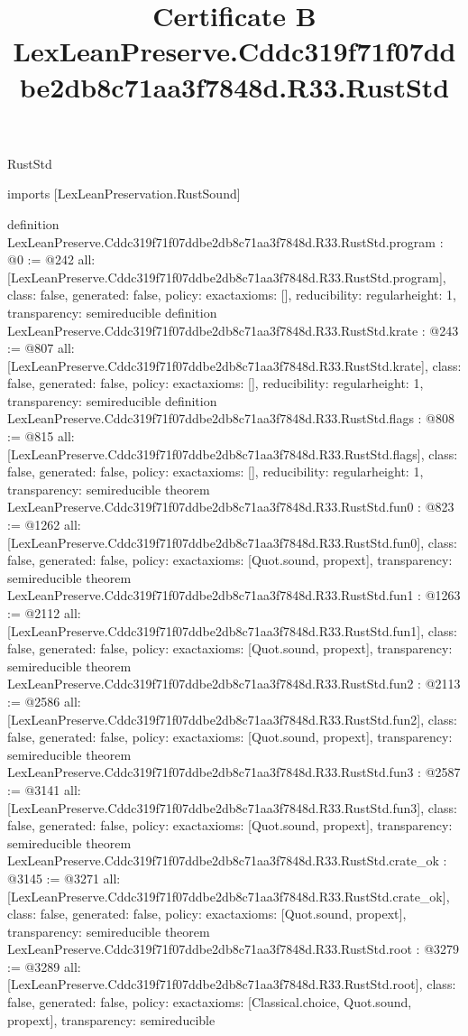 \begin{lexlean}{RustStd}
\title{Certificate B LexLeanPreserve.Cddc319f71f07ddbe2db8c71aa3f7848d.R33.RustStd}
\begin{coremodule}
imports [LexLeanPreservation.RustSound]

definition LexLeanPreserve.Cddc319f71f07ddbe2db8c71aa3f7848d.R33.RustStd.program : @0 := @242 {
  all: [LexLeanPreserve.Cddc319f71f07ddbe2db8c71aa3f7848d.R33.RustStd.program],
  class: false,
  generated: false,
  policy: exact{axioms: []},
  reducibility: regular{height: 1},
  transparency: semireducible
}
definition LexLeanPreserve.Cddc319f71f07ddbe2db8c71aa3f7848d.R33.RustStd.krate : @243 := @807 {
  all: [LexLeanPreserve.Cddc319f71f07ddbe2db8c71aa3f7848d.R33.RustStd.krate],
  class: false,
  generated: false,
  policy: exact{axioms: []},
  reducibility: regular{height: 1},
  transparency: semireducible
}
definition LexLeanPreserve.Cddc319f71f07ddbe2db8c71aa3f7848d.R33.RustStd.flags : @808 := @815 {
  all: [LexLeanPreserve.Cddc319f71f07ddbe2db8c71aa3f7848d.R33.RustStd.flags],
  class: false,
  generated: false,
  policy: exact{axioms: []},
  reducibility: regular{height: 1},
  transparency: semireducible
}
theorem LexLeanPreserve.Cddc319f71f07ddbe2db8c71aa3f7848d.R33.RustStd.fun0 : @823 := @1262 {
  all: [LexLeanPreserve.Cddc319f71f07ddbe2db8c71aa3f7848d.R33.RustStd.fun0],
  class: false,
  generated: false,
  policy: exact{axioms: [Quot.sound, propext]},
  transparency: semireducible
}
theorem LexLeanPreserve.Cddc319f71f07ddbe2db8c71aa3f7848d.R33.RustStd.fun1 : @1263 := @2112 {
  all: [LexLeanPreserve.Cddc319f71f07ddbe2db8c71aa3f7848d.R33.RustStd.fun1],
  class: false,
  generated: false,
  policy: exact{axioms: [Quot.sound, propext]},
  transparency: semireducible
}
theorem LexLeanPreserve.Cddc319f71f07ddbe2db8c71aa3f7848d.R33.RustStd.fun2 : @2113 := @2586 {
  all: [LexLeanPreserve.Cddc319f71f07ddbe2db8c71aa3f7848d.R33.RustStd.fun2],
  class: false,
  generated: false,
  policy: exact{axioms: [Quot.sound, propext]},
  transparency: semireducible
}
theorem LexLeanPreserve.Cddc319f71f07ddbe2db8c71aa3f7848d.R33.RustStd.fun3 : @2587 := @3141 {
  all: [LexLeanPreserve.Cddc319f71f07ddbe2db8c71aa3f7848d.R33.RustStd.fun3],
  class: false,
  generated: false,
  policy: exact{axioms: [Quot.sound, propext]},
  transparency: semireducible
}
theorem LexLeanPreserve.Cddc319f71f07ddbe2db8c71aa3f7848d.R33.RustStd.crate_ok : @3145 := @3271 {
  all: [LexLeanPreserve.Cddc319f71f07ddbe2db8c71aa3f7848d.R33.RustStd.crate_ok],
  class: false,
  generated: false,
  policy: exact{axioms: [Quot.sound, propext]},
  transparency: semireducible
}
theorem LexLeanPreserve.Cddc319f71f07ddbe2db8c71aa3f7848d.R33.RustStd.root : @3279 := @3289 {
  all: [LexLeanPreserve.Cddc319f71f07ddbe2db8c71aa3f7848d.R33.RustStd.root],
  class: false,
  generated: false,
  policy: exact{axioms: [Classical.choice, Quot.sound, propext]},
  transparency: semireducible
}


\end{coremodule}
\end{lexlean}
